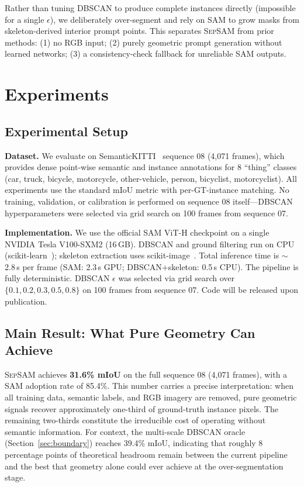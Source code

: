 \documentclass{article}
\begin{document}
Rather than tuning DBSCAN to produce complete instances directly (impossible for a
single $\epsilon$), we deliberately over-segment and rely on SAM to grow masks from
skeleton-derived interior prompt points. This separates \textsc{SepSAM} from prior
methods: (1) no RGB input; (2) purely geometric prompt generation without learned
networks; (3) a consistency-check fallback for unreliable SAM outputs.

\section{Experiments}

\subsection{Experimental Setup}

\textbf{Dataset.} We evaluate on SemanticKITTI~\cite{Behley_2019_ICCV}
sequence 08 (4,071 frames), which provides dense point-wise semantic and instance
annotations for 8 ``thing'' classes (car, truck, bicycle, motorcycle, other-vehicle,
person, bicyclist, motorcyclist). All experiments use the standard mIoU metric with
per-GT-instance matching. No training, validation, or calibration is performed on
sequence 08 itself---DBSCAN hyperparameters were selected via grid search on 100
frames from sequence 07.

\textbf{Implementation.} We use the official SAM ViT-H checkpoint on a single NVIDIA
Tesla V100-SXM2 (16\,GB). DBSCAN and ground filtering run on CPU
(scikit-learn~\cite{pedregosa2011scikit}); skeleton extraction uses
scikit-image~\cite{vanderwalt2014scikit}. Total inference time is $\sim$2.8\,s per
frame (SAM: 2.3\,s GPU; DBSCAN+skeleton: 0.5\,s CPU). The pipeline is fully
deterministic. DBSCAN $\epsilon$ was selected via grid search over
$\{0.1, 0.2, 0.3, 0.5, 0.8\}$ on 100 frames from sequence 07. Code will be
released upon publication.

\subsection{Main Result: What Pure Geometry Can Achieve}

\textsc{SepSAM} achieves \textbf{31.6\% mIoU} on the full sequence 08 (4,071 frames),
with a SAM adoption rate of 85.4\%. This number carries a precise interpretation: when
all training data, semantic labels, and RGB imagery are removed, pure geometric signals
recover approximately one-third of ground-truth instance pixels. The remaining two-thirds
constitute the irreducible cost of operating without semantic information. For context,
the multi-scale DBSCAN oracle (Section~\ref{sec:boundary}) reaches 39.4\% mIoU,
indicating that roughly 8 percentage points of theoretical headroom remain between the
current pipeline and the best that geometry alone could ever achieve at the
over-segmentation stage.
\end{document}
